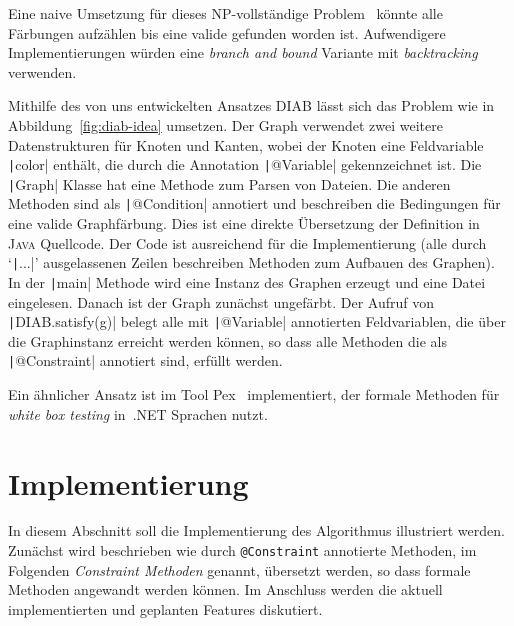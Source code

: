 \documentclass[a4paper,fontsize=12pt,headings=small,captions=tableheading,%
numbers=endperiod,abstracton,pdftex]{scrartcl}
\begin{document}
Eine naive Umsetzung für dieses NP-vollständige Problem~\cite{Kar:72} könnte
alle Färbungen aufzählen bis eine valide gefunden worden ist.  Aufwendigere
Implementierungen würden eine \emph{branch and bound} Variante mit
\emph{backtracking} verwenden.

Mithilfe des von uns entwickelten Ansatzes \textsc{DIAB} lässt sich das Problem
wie in Abbildung~\ref{fig:diab-idea} umsetzen.  Der Graph verwendet zwei weitere
Datenstrukturen für Knoten und Kanten, wobei der Knoten eine Feldvariable
\texttt|color| enthält, die durch die Annotation
\texttt|@Variable| gekennzeichnet ist.  Die \texttt|Graph|
Klasse hat eine Methode zum Parsen von Dateien.  Die anderen Methoden sind als
\texttt|@Condition| annotiert und beschreiben die Bedingungen für eine
valide Graphfärbung.  Dies ist eine direkte Übersetzung der Definition in
\textsc{Java} Quellcode.  Der Code ist ausreichend für die Implementierung (alle
durch `\texttt|...|' ausgelassenen Zeilen beschreiben Methoden zum
Aufbauen des Graphen).  In der \texttt|main| Methode wird eine Instanz
des Graphen erzeugt und eine Datei eingelesen. Danach ist der Graph zunächst
ungefärbt.  Der Aufruf von \texttt|DIAB.satisfy(g)| belegt alle mit
\texttt|@Variable| annotierten Feldvariablen, die über die
Graphinstanz erreicht werden können, so dass alle Methoden die als
\texttt|@Constraint| annotiert sind, erfüllt werden.

Ein ähnlicher Ansatz ist im Tool Pex~\cite{TS:05} implementiert, der formale
Methoden für \emph{white box testing} in~.NET Sprachen nutzt.

\section{Implementierung}
In diesem Abschnitt soll die Implementierung des Algorithmus illustriert werden.
Zunächst wird beschrieben wie durch \texttt{@Constraint} annotierte
Methoden, im Folgenden \emph{Constraint Methoden} genannt, übersetzt werden, so
dass formale Methoden angewandt werden können.  Im Anschluss werden die aktuell
implementierten und geplanten Features diskutiert.
\end{document}
